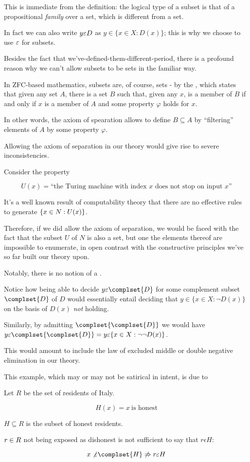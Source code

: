This is immediate from the definition: the logical type of a subset
is that of a propositional \emph{family} over a set, which is
different from a set.

In fact we can also write \(y \varepsilon D\) as
\(y \in \{x \in X : D(x)\}\); this is why we choose to use \(\varepsilon\)
for subsets.

Besides the fact that we've-defined-them-different-period, there is a
profound reason why we can't allow subsets to be sets in the familiar
way.

In ZFC-based mathematics, subsets are, of course, sets - by the
, which states that given any set $A$,
there is a set $B$ such that, given any $x$, is a member of $B$ if and
only if $x$ is a member of $A$ and some property $\varphi$ holds for $x$.

In other words, the axiom of spearation allows to define
$B \subseteq A$ by ``filtering'' elements of $A$ by some property
$\varphi$.

Allowing the axiom of separation in our theory would give rise to
severe inconsistencies.

Consider the property

\[ U(x) = \text{``the Turing machine with index
  $x$ does not stop on input $x$''} \]

It's a well known result of computability theory that there are no
effective rules to generate $\{x \in N : U(x) \}$.

Therefore, if we did allow the axiom of separation, we would be faced
with the fact that the subset $U$ of $N$ is also a set, but one the
elements thereof are impossible to enumerate, in open contrast with
the constructive principles we've so far built our theory upon.

Notably, there is no notion of a .

Notice how being able to decide \(\injsub{y}{\complset{D}}\) for
some complement subset \(\complset{D}\) of \(D\) would essentially
entail deciding that \(y \in \{ x \in X : \neg D(x) \}\) on the
basis of \(D(x)\) \emph{not} holding.

Similarly, by admitting \(\complset{\complset{D}}\) we would have 
\(\injsub{y}{\complset{\complset{D}}} = \injsub{y}{\{ x \in X : \neg\neg D(x) \}}\).

This would amount to include the law of excluded middle or double negative
elimination in our theory.

\begin{example}
  This example, which may or may not be satirical in intent, is due
  to %

  Let \(R\) be the set of residents of Italy.
  
  \[ H(x) = x\ \text{is honest} \]
  
  \(H \subseteq R\) is the subset of honest residents.

  \(r \in R\) not being exposed as dishonest is not sufficient to say that
  \(r \epsilon H\):
  
  \[ \notinjsub{x}{\complset{H}} \not\Rightarrow \injsub{r}{H} \]
\end{example}

